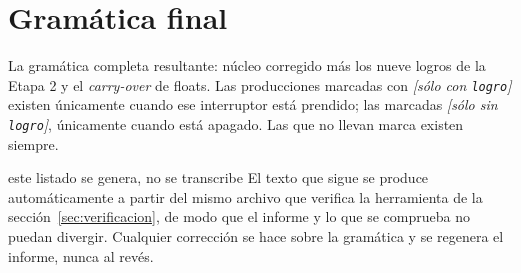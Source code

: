 \section{Gramática final}
\label{sec:gramatica-final}

La gramática completa resultante: núcleo corregido más los nueve logros de la Etapa 2 y el
\emph{carry-over} de floats. Las producciones marcadas con \textit{[sólo con \texttt{logro}]}
existen únicamente cuando ese interruptor está prendido; las marcadas \textit{[sólo sin
\texttt{logro}]}, únicamente cuando está apagado. Las que no llevan marca existen siempre.

\begin{decision}{este listado se genera, no se transcribe}
El texto que sigue se produce automáticamente a partir del mismo archivo que verifica la
herramienta de la sección~\ref{sec:verificacion}, de modo que el informe y lo que se comprueba no
puedan divergir. Cualquier corrección se hace sobre la gramática y se regenera el informe, nunca al
revés.
\end{decision}


